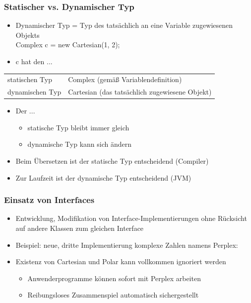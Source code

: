 \subsubsection{Statischer vs. Dynamischer Typ}
\begin{itemize}
\item Dynamischer Typ = Typ des tatsächlich an eine Variable zugewiesenen Objekts\\
Complex c = new Cartesian(1, 2);
\item c hat den ...
\end{itemize}
\begin{tabular}{ll}
statischen Typ & Complex (gemäß Variablendefinition) \\
dynamischen Typ & Cartesian (das tatsächlich zugewiesene Objekt)\\
\end{tabular}
\begin{itemize}
\item Der ...
\begin{itemize}
\item statische Typ bleibt immer gleich
\item dynamische Typ kann sich ändern
\end{itemize}
\item Beim Übersetzen ist der statische Typ entscheidend (Compiler)
\item Zur Laufzeit ist der dynamische Typ entscheidend (JVM)
\end{itemize}

\subsubsection{Einsatz von Interfaces}
\begin{itemize}
\item Entwicklung, Modifikation von Interface-Implementierungen ohne Rücksicht auf andere Klassen zum gleichen Interface
\item Beispiel: neue, dritte Implementierung komplexe Zahlen namens Perplex:
\item Existenz von Cartesian und Polar kann vollkommen ignoriert werden
\begin{itemize}
\item Anwenderprogramme können sofort mit Perplex arbeiten
\item  Reibungsloses Zusammenspiel automatisch sichergestellt
\end{itemize}
\end{itemize}
